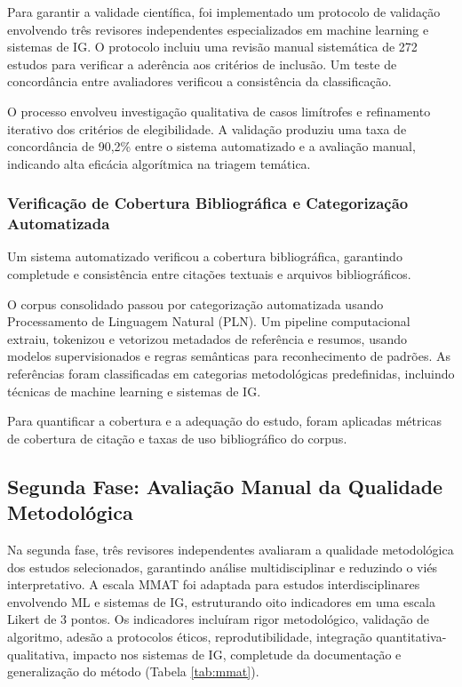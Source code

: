 Para garantir a validade científica, foi implementado um protocolo de validação envolvendo três revisores independentes especializados em machine learning e sistemas de IG. O protocolo incluiu uma revisão manual sistemática de 272 estudos para verificar a aderência aos critérios de inclusão. Um teste de concordância entre avaliadores verificou a consistência da classificação.

O processo envolveu investigação qualitativa de casos limítrofes e refinamento iterativo dos critérios de elegibilidade. A validação produziu uma taxa de concordância de 90,2\% entre o sistema automatizado e a avaliação manual, indicando alta eficácia algorítmica na triagem temática.

\subsubsection{Verificação de Cobertura Bibliográfica e Categorização Automatizada}

Um sistema automatizado verificou a cobertura bibliográfica, garantindo completude e consistência entre citações textuais e arquivos bibliográficos.

O corpus consolidado passou por categorização automatizada usando Processamento de Linguagem Natural (PLN). Um pipeline computacional extraiu, tokenizou e vetorizou metadados de referência e resumos, usando modelos supervisionados e regras semânticas para reconhecimento de padrões. As referências foram classificadas em categorias metodológicas predefinidas, incluindo técnicas de machine learning e sistemas de IG.

Para quantificar a cobertura e a adequação do estudo, foram aplicadas métricas de cobertura de citação e taxas de uso bibliográfico do corpus.

\subsection{Segunda Fase: Avaliação Manual da Qualidade Metodológica}

Na segunda fase, três revisores independentes avaliaram a qualidade metodológica dos estudos selecionados, garantindo análise multidisciplinar e reduzindo o viés interpretativo. A escala MMAT foi adaptada para estudos interdisciplinares envolvendo ML e sistemas de IG, estruturando oito indicadores em uma escala Likert de 3 pontos. Os indicadores incluíram rigor metodológico, validação de algoritmo, adesão a protocolos éticos, reprodutibilidade, integração quantitativa-qualitativa, impacto nos sistemas de IG, completude da documentação e generalização do método (Tabela \ref{tab:mmat}).


